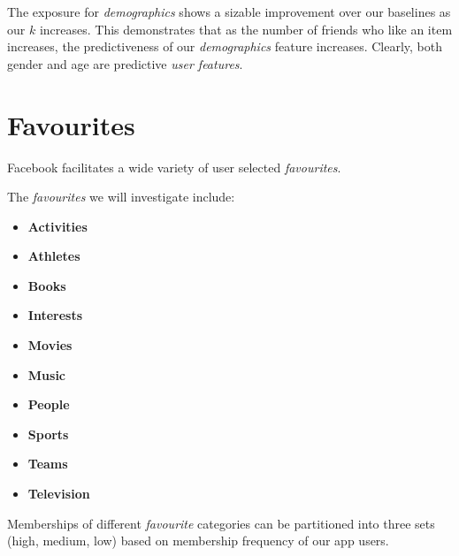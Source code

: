 The exposure for \emph{demographics} shows a sizable improvement over our baselines as our $k$ increases. This demonstrates that as the
number of friends who like an item increases, the predictiveness of our \emph{demographics} feature increases. Clearly, both gender and 
age are predictive \emph{user features}.

\section{Favourites}
\label{sec:traits}

Facebook facilitates a wide variety of user selected \emph{favourites}. 

The \emph{favourites} we will investigate include:
\begin{itemize}
\item \textbf{Activities}
\item \textbf{Athletes}
\item \textbf{Books}
\item \textbf{Interests}
\item \textbf{Movies}
\item \textbf{Music}
\item \textbf{People}
\item \textbf{Sports}
\item \textbf{Teams}
\item \textbf{Television}
\end{itemize}

Memberships of different \emph{favourite} categories can be partitioned into three sets (high, medium, low) based on membership 
frequency of our app users. 

